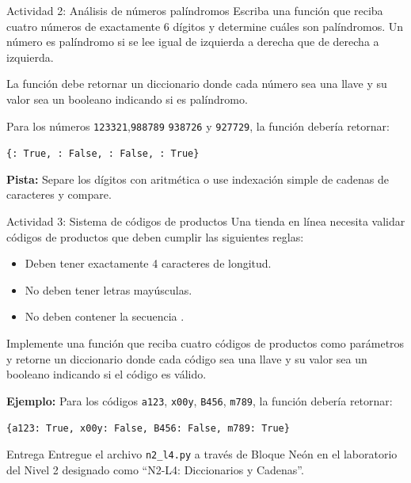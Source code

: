\documentclass{ip-lab}
\begin{document}
\begin{sectionbox}{Actividad 2: Análisis de números palíndromos}
Escriba una función que reciba cuatro números de exactamente 6 dígitos y determine cuáles son palíndromos. Un número es palíndromo si se lee igual de izquierda a derecha que de derecha a izquierda.

La función debe retornar un diccionario donde cada número sea una llave y su valor sea un booleano indicando si es palíndromo.

Para los números \texttt{123321},\texttt{988789} \texttt{938726} y \texttt{927729}, la función debería retornar:

\texttt{\{\textquotedbl: True, \textquotedbl: False, \textquotedbl: False, \textquotedbl: True\}}

\textbf{Pista:} Separe los dígitos con aritmética o use indexación simple de cadenas de caracteres y compare.
\end{sectionbox}

\begin{sectionbox}{Actividad 3: Sistema de códigos de productos}
Una tienda en línea necesita validar códigos de productos que deben cumplir las siguientes reglas:
\begin{itemize}
  \item Deben tener exactamente 4 caracteres de longitud.
  \item No deben tener letras mayúsculas.
  \item No deben contener la secuencia \texttt{\textquotedbl}.
\end{itemize}

Implemente una función que reciba cuatro códigos de productos como parámetros y retorne un diccionario donde cada código sea una llave y su valor sea un booleano indicando si el código es válido.

\textbf{Ejemplo:} Para los códigos \texttt{\textquotedbl a123\textquotedbl}, \texttt{\textquotedbl x00y\textquotedbl}, \texttt{\textquotedbl B456\textquotedbl}, \texttt{\textquotedbl m789\textquotedbl}, la función debería retornar:

\texttt{\{\textquotedbl a123\textquotedbl: True, \textquotedbl x00y\textquotedbl: False, \textquotedbl B456\textquotedbl: False, \textquotedbl m789\textquotedbl: True\}}
\end{sectionbox}

\begin{sectionbox}{Entrega}
Entregue el archivo \texttt{n2\_l4.py} a través de Bloque Neón en el laboratorio del Nivel 2 designado como ``N2-L4: Diccionarios y Cadenas''.
\end{sectionbox}
\end{document}
